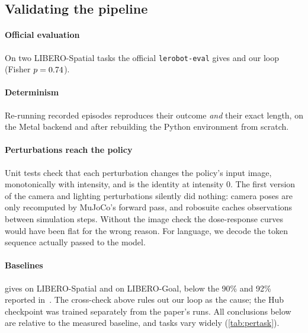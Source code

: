 \documentclass[10pt,twocolumn,letterpaper]{article}
\begin{document}
\subsection{Validating the pipeline}
\label{sec:validation}
\paragraph{Official evaluation} On two LIBERO-Spatial tasks the official \texttt{lerobot-eval} gives
\LerobotEvalCheck{} and our loop \OurEvalCheck{} (Fisher $p=0.74$).
\paragraph{Determinism} Re-running recorded episodes reproduces their outcome \emph{and} their exact
length, on the Metal backend and after rebuilding the Python environment from scratch.
\paragraph{Perturbations reach the policy} Unit tests check that each perturbation changes the policy's
input image, monotonically with intensity, and is the identity at intensity 0. The first version of the
camera and lighting perturbations silently did nothing: camera poses are only recomputed by MuJoCo's
forward pass, and robosuite caches observations between simulation steps. Without the image check the
dose-response curves would have been flat for the wrong reason. For language, we decode the token
sequence actually passed to the model.

\begin{table}[t]
\centering
\caption{\textbf{Unperturbed success.} Wilson 95\% intervals in brackets. The reported numbers may refer to
a different checkpoint than the one on the Hub.}
\label{tab:baselines}
\small
\resizebox{\columnwidth}{!}{}
\end{table}

\paragraph{Baselines}  gives \BaseSpatial{} on LIBERO-Spatial and \BaseGoal{} on
LIBERO-Goal, below the 90\% and 92\% reported in~\citep{shukor2025smolvla}. The cross-check above rules
out our loop as the cause; the Hub checkpoint was trained separately from the paper's runs. All conclusions
below are relative to the measured baseline, and tasks vary widely (\cref{tab:pertask}).
\end{document}
